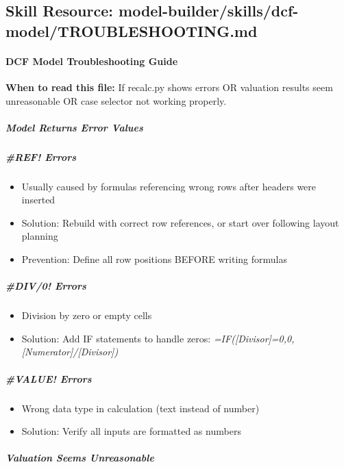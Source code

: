\documentclass[11pt]{article}
\begin{document}
\subsection{Skill Resource: model-builder/skills/dcf-model/TROUBLESHOOTING.md}\label{file:model-builder-skills-dcf-model-TROUBLESHOOTING-md}

\paragraph{DCF Model Troubleshooting Guide}\mbox{}\par

\textbf{When to read this file:} If recalc.py shows errors OR valuation results seem unreasonable OR case selector not working properly.


\subparagraph{Model Returns Error Values}\mbox{}\par

\subparagraph{\#REF! Errors}\mbox{}\par
\begin{itemize}[leftmargin=*,itemsep=2pt,topsep=2pt]
\item {} Usually caused by formulas referencing wrong rows after headers were inserted
\item {} Solution: Rebuild with correct row references, or start over following layout planning
\item {} Prevention: Define all row positions BEFORE writing formulas
\end{itemize}

\subparagraph{\#DIV/0! Errors}\mbox{}\par
\begin{itemize}[leftmargin=*,itemsep=2pt,topsep=2pt]
\item {} Division by zero or empty cells
\item {} Solution: Add IF statements to handle zeros: \emph{=IF([Divisor]=0,0,[Numerator]/[Divisor])}
\end{itemize}

\subparagraph{\#VALUE! Errors}\mbox{}\par
\begin{itemize}[leftmargin=*,itemsep=2pt,topsep=2pt]
\item {} Wrong data type in calculation (text instead of number)
\item {} Solution: Verify all inputs are formatted as numbers
\end{itemize}

\subparagraph{Valuation Seems Unreasonable}\mbox{}\par
\end{document}
